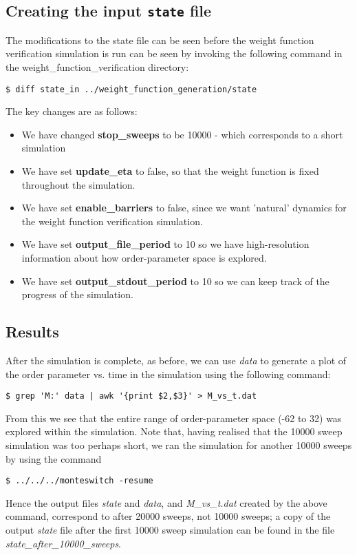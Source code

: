 \documentclass{report}
\begin{document}
\subsection{Creating the input \texttt{state} file}
The modifications to the state file can be seen before the weight function verification simulation is run can be seen by invoking the following command
in the weight\_function\_verification directory:
\begin{verbatim}
$ diff state_in ../weight_function_generation/state
\end{verbatim}
The key changes are as follows:
\begin{itemize}
\item We have changed \textbf{stop\_sweeps} to be 10000 - which corresponds to a short simulation
\item We have set \textbf{update\_eta} to false, so that the weight function is fixed throughout the simulation.
\item We have set \textbf{enable\_barriers} to false, since we want 'natural' dynamics for the weight function verification simulation.
\item We have set \textbf{output\_file\_period} to 10 so we have high-resolution information about how order-parameter space is explored.
\item We have set \textbf{output\_stdout\_period} to 10 so we can keep track of the progress of the simulation.
\end{itemize}

\subsection{Results}
After the simulation is complete, as before, we can use \emph{data} to generate a plot of the order parameter vs. time in the simulation using the
following command:
\begin{verbatim}
$ grep 'M:' data | awk '{print $2,$3}' > M_vs_t.dat
\end{verbatim}
From this we see that the entire range of order-parameter space (-62 to 32) was explored within the simulation. Note that, having realised that the
10000 sweep simulation was too perhaps short, we ran the simulation for another 10000 sweeps by using the command
\begin{verbatim}
$ ../../../monteswitch -resume
\end{verbatim}
Hence the output files \emph{state} and \emph{data}, and \emph{M\_vs\_t.dat} created by the above command, correspond to after 20000 sweeps, not 10000 
sweeps; a copy of the 
output \emph{state} file after the first 10000 sweep simulation can be found in the file \emph{state\_after\_10000\_sweeps}.
\end{document}
